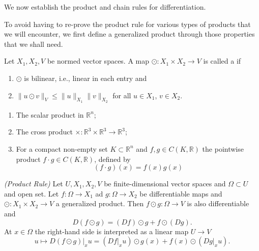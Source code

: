 \documentclass[10pt]{article}
\let\emph\relax %
\newcommand{\R}{\mathbb{R}}
\begin{document}
  We now establish the product and chain rules for differentiation.
  
  To avoid having to re-prove the product rule for various types of products that we will encounter, we first define a generalized
  product through those properties that we shall need.

  \begin{definition}
    Let $X_{1},X_{2},V$ be normed vector spaces. A map $\odot : X_{1} \times X_{2} \to V$ is called a \emph{(generalized product)} if
    \begin{enumerate}
      \item $\odot$ is bilinear, i.e., linear in each entry and
      \item $\|u \odot v\|_{V} \leq \|u\|_{X_{1}}\|v\|_{X_{2}}$ for all $u \in X_{1}$, $v \in X_{2}$.
    \end{enumerate}
  \end{definition}

  \begin{example}
    \begin{enumerate}
      \item The scalar product in $\R^{n}$;
      \item The cross product $\times:\R^{3} \times \R^{3} \to \R^{3}$;
      \item For a compact non-empty set $K \subset \R^{n}$ and $f,g \in C(K,\R)$ the pointwise product $f \cdot g \in C(K, \R)$, defined by
      \[(f \cdot g)(x) = f(x)g(x)\]
    \end{enumerate}
  \end{example}

  \begin{theorem}
    \textit{(Product Rule)} Let $U,X_{1},X_{2},V$ be finite-dimensional vector spaces and $\Omega \subset U$ and open set.
    Let $f : \Omega \to X_{1}$ ad $g : \Omega \to X_{2}$ be differentiable maps and $\odot : X_{1} \times X_{2} \to V$ a generalized product.
    Then $f \odot g : \Omega \to V$ is also differentiable and 
    \begin{equation}
      D(f \odot g) = (Df) \odot g + f \odot (Dg).
    \end{equation}
    At $x \in \Omega$ the right-hand side is interpreted as a linear map $U \to V$
    \begin{equation}
      u \mapsto D(f \odot g)|_{x}u = (Df|_{x}u) \odot g(x) + f(x) \odot (Dg|_{x}u).
    \end{equation}
  \end{theorem}
\end{document}
